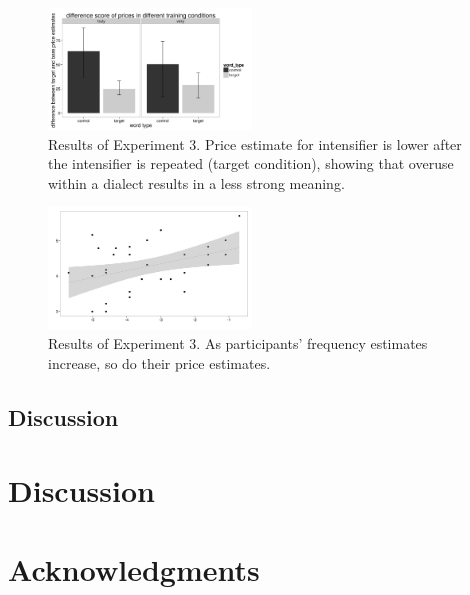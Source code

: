 \documentclass[10pt,letterpaper]{article}
\begin{document}
\begin{figure}[ht]
\begin{center}
\includegraphics[width=0.48\textwidth]{analysis_files_for_writeup/images/exp3-price-plot.png}
\end{center}
\caption{Results of Experiment 3. Price estimate for intensifier is lower after the intensifier is repeated (target condition), showing that overuse within a dialect results in a less strong meaning.} 
\label{exp3-price-plot}
\end{figure}

\begin{figure}[ht]
\begin{center}
\includegraphics[width=0.48\textwidth]{analysis_files_for_writeup/images/exp3-scatterplot.png}
\end{center}
\caption{Results of Experiment 3. As participants' frequency estimates increase, so do their price estimates.} 
\label{exp3-scatterplot}
\end{figure}

\subsection{Discussion}


\section{Discussion}


\section{Acknowledgments}
\end{document}
